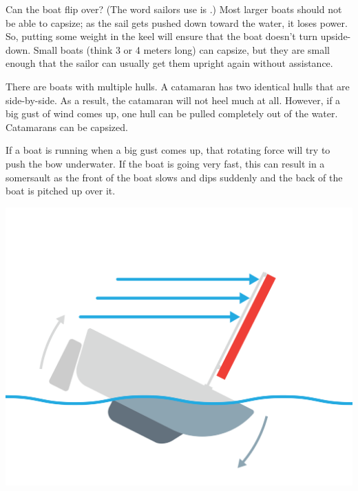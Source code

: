 Can the boat flip over?  (The word sailors use is .)  Most larger boats should not be able to capsize; as the sail gets pushed down toward the water, it loses power.  So, putting some weight in the keel will ensure that the boat doesn't turn upside-down.  Small boats (think 3 or 4 meters long) can capsize,  but they are small enough that the sailor can usually
get them upright again without assistance.

There are boats with multiple hulls. A catamaran has two identical hulls that are side-by-side.  As a result,  the catamaran will not heel much at all.  However,  if a big gust of wind comes up, one hull can be pulled completely out of the water.  Catamarans can be capsized.

If a boat is running when a big gust comes up,  that rotating force will try to push the bow underwater. If the boat is going very fast,  this can result in a somersault as
the front of the boat slows and dips suddenly and the back of the boat is pitched up over it.

\begin{center}
    \includegraphics[width=.75\textwidth]{heeling.png}

\end{center}
